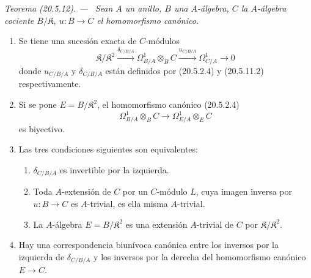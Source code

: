 \documentclass[10pt,oneside]{book}
\makeatletter
\newcommand{\setmanualcurrentlabel}[1]{\def\@currentlabel{#1}}
\newenvironment{theorem}[1][]{%
  \setmanualcurrentlabel{#1}\par\medskip\noindent\itshape Teorema (#1). ---\ }{\par}
\makeatother
\begin{document}
\begin{theorem}[20.5.12]
\label{0.20.5.12-es}
Sean $A$ un anillo, $B$ una $A$-álgebra, $C$ la $A$-álgebra cociente
$B/\mathfrak K$, $u:B\to C$ el homomorfismo canónico.
\begin{enumerate}
  \item[\rm(i)] Se tiene una sucesión exacta de $C$-módulos
\begin{equation}
\tag{20.5.12.1}
\label{0.20.5.12.1-es}
  \mathfrak K/\mathfrak K^2
  \xrightarrow{\delta_{C/B/A}}\Omega^1_{B/A}\otimes_B C
  \xrightarrow{u_{C/B/A}}\Omega^1_{C/A}\longrightarrow 0
\end{equation}
donde $u_{C/B/A}$ y $\delta_{C/B/A}$ están definidos por (20.5.2.4) y
(20.5.11.2) respectivamente.
  \item[\rm(ii)] Si se pone $E=B/\mathfrak K^2$, el homomorfismo
canónico (20.5.2.4)
\[
  \Omega^1_{B/A}\otimes_B C\longrightarrow
  \Omega^1_{E/A}\otimes_E C
\]
es biyectivo.
  \item[\rm(iii)] Las tres condiciones siguientes son equivalentes:
  \begin{enumerate}
    \item[\rm a)] $\delta_{C/B/A}$ es invertible por la izquierda.
    \item[\rm b)] Toda $A$-extensión de $C$ por un $C$-módulo $L$, cuya
imagen inversa por $u:B\to C$ es $A$-trivial, es ella misma
$A$-trivial.
    \item[\rm c)] La $A$-álgebra $E=B/\mathfrak K^2$ es una extensión
$A$-trivial de $C$ por $\mathfrak K/\mathfrak K^2$.
  \end{enumerate}
  \item[\rm(iv)] Hay una correspondencia biunívoca canónica entre los
inversos por la izquierda de $\delta_{C/B/A}$ y los inversos por la derecha del
homomorfismo canónico $E\to C$.
\end{enumerate}
\end{theorem}
\end{document}
